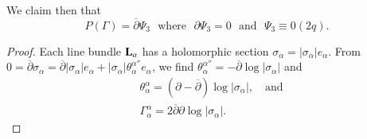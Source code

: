We claim then that
\begin{equation*}
P(\Gamma)=\overline{\partial}\Psi_{3}\text{~ where~ } \partial \Psi_{3}=0\text{~ and~ }\Psi_{3}\equiv 0(2q).\tag{A4.26}\label{art08-sec4-eqA4.26}
\end{equation*}

\begin{proof}
Each line bundle $\mathbf{L}_{\alpha}$ has a holomorphic section $\sigma_{\alpha}=|\sigma_{\alpha}|e_{\alpha}$. From $0=\overline{\partial}\sigma_{\alpha}=\overline{\partial}|\sigma_{\alpha}|e_{\alpha}+|\sigma_{\alpha}|\theta^{\alpha''}_{\alpha}e_{\alpha}$, we find $\theta^{\alpha''}_{\alpha}=-\overline{\partial}\log |\sigma_{\alpha}|$ and 
\begin{align*}
& \theta^{\alpha}_{\alpha}=(\partial - \overline{\partial})\log |\sigma_{\alpha}|,\quad\text{and}\tag{A4.27}\label{art08-sec4-eqA4.27}\\[3pt]
& \Gamma^{\alpha}_{\alpha}=2\overline{\partial}\partial \log |\sigma_{\alpha}|.\tag{A4.28}\label{art08-sec4-eqA4.28}
\end{align*}


\end{proof}
